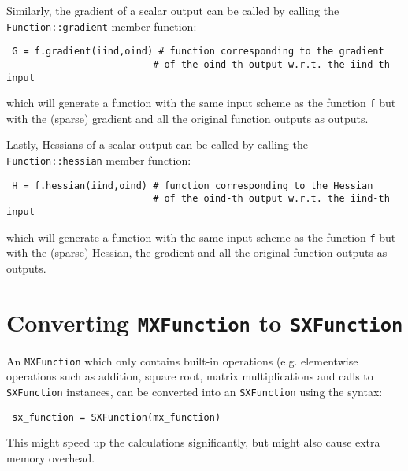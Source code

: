 \documentclass[a4paper,12pt]{book}
\begin{document}
Similarly, the gradient of a scalar output can be called by calling the \texttt{Function::gradient} member function:
\begin{verbatim}
 G = f.gradient(iind,oind) # function corresponding to the gradient
                          # of the oind-th output w.r.t. the iind-th input
\end{verbatim}
which will generate a function with the same input scheme as the function \texttt{f} but with the (sparse) gradient and all the original function outputs as outputs.

Lastly, Hessians of a scalar output can be called by calling the \texttt{Function::hessian} member function:
\begin{verbatim}
 H = f.hessian(iind,oind) # function corresponding to the Hessian
                          # of the oind-th output w.r.t. the iind-th input
\end{verbatim}
which will generate a function with the same input scheme as the function \texttt{f} but with the (sparse) Hessian, the gradient and all the original function outputs as outputs.

\section{Converting \texttt{MXFunction} to \texttt{SXFunction}}
An \texttt{MXFunction} which only contains built-in operations (e.g. elementwise operations such as addition, square root, matrix multiplications and calls to \texttt{SXFunction} instances, can be converted into an \texttt{SXFunction} using the syntax:
\begin{verbatim}
 sx_function = SXFunction(mx_function)
\end{verbatim}

This might speed up the calculations significantly, but might also cause extra memory overhead.



\end{document}
